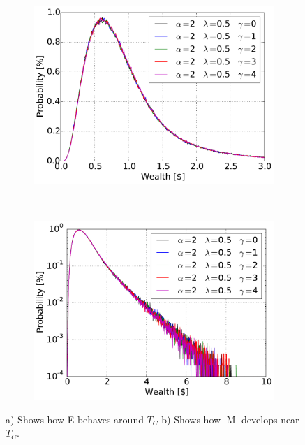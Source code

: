 \begin{figure}[H]
    \centering
    \begin{subfigure}{0.5\textwidth}
        \centering
        \includegraphics[width=\linewidth]{result/bilder/5e-2-50}
        \caption{}
    \end{subfigure}%
    ~ 
    \begin{subfigure}{0.5\textwidth}
        \centering
        \includegraphics[width=\linewidth]{result/bilder/5e-2-50-log}
        \caption{}
    \end{subfigure}
    \caption{a) Shows how E behaves around $T_C$ b) Shows how |M| develops near $T_C$.}
    \label{fig:5e-2-50}
\end{figure}















